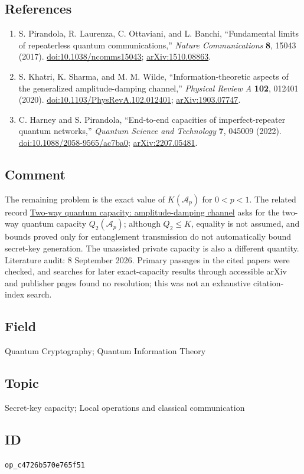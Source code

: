 \subsection*{References}

\begin{enumerate}[label={},leftmargin=4.8em,labelsep=0.5em]
  \footnotesize
  \item[\textup{[PLOB17]}]\label{ref:adkey-plob}
  S. Pirandola, R. Laurenza, C. Ottaviani, and L. Banchi, ``Fundamental limits of repeaterless quantum communications,'' \emph{Nature Communications} \textbf{8}, 15043 (2017). \href{https://doi.org/10.1038/ncomms15043}{doi:10.1038/ncomms15043}; \href{https://arxiv.org/abs/1510.08863}{arXiv:1510.08863}.

  \item[\textup{[KSW20]}]\label{ref:adkey-khatri}
  S. Khatri, K. Sharma, and M. M. Wilde, ``Information-theoretic aspects of the generalized amplitude-damping channel,'' \emph{Physical Review A} \textbf{102}, 012401 (2020). \href{https://doi.org/10.1103/PhysRevA.102.012401}{doi:10.1103/PhysRevA.102.012401}; \href{https://arxiv.org/abs/1903.07747}{arXiv:1903.07747}.

  \item[\textup{[HP22]}]\label{ref:adkey-harney}
  C. Harney and S. Pirandola, ``End-to-end capacities of imperfect-repeater quantum networks,'' \emph{Quantum Science and Technology} \textbf{7}, 045009 (2022). \href{https://doi.org/10.1088/2058-9565/ac7ba0}{doi:10.1088/2058-9565/ac7ba0}; \href{https://arxiv.org/abs/2207.05481}{arXiv:2207.05481}.
\end{enumerate}

\subsection*{Comment}

The remaining problem is the exact value of $K(\mathcal A_p)$ for $0<p<1$. The related record \href{https://qiqc-op.com/problem/op_e490c9462b37a548/}{Two-way quantum capacity: amplitude-damping channel} asks for the two-way quantum capacity $Q_2(\mathcal A_p)$; although $Q_2\le K$, equality is not assumed, and bounds proved only for entanglement transmission do not automatically bound secret-key generation. The unassisted private capacity is also a different quantity. Literature audit: 8 September 2026. Primary passages in the cited papers were checked, and searches for later exact-capacity results through accessible arXiv and publisher pages found no resolution; this was not an exhaustive citation-index search.

\subsection*{Field}

Quantum Cryptography; Quantum Information Theory

\subsection*{Topic}

Secret-key capacity; Local operations and classical communication

\subsection*{ID}

\texttt{op\_c4726b570e765f51}
